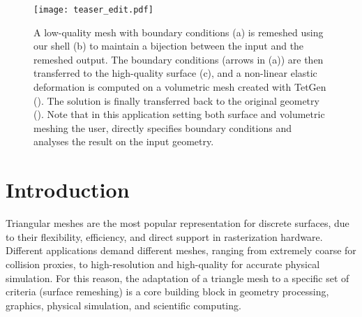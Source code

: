 
\begin{figure}
	\centering
	\texttt{[image: teaser\_edit.pdf]}
    \caption{A low-quality mesh with boundary conditions (a)
    is remeshed using our shell (b)
    to maintain a bijection between the input and the remeshed output.
    The boundary conditions (arrows in (a)) are then transferred to the high-quality surface (c),
    and a non-linear elastic deformation is computed %
    on a volumetric mesh created with TetGen ().
    The solution is finally transferred back to the original geometry ().
    Note that in this application setting both surface and volumetric meshing  the user,  directly specifies boundary conditions and analyses the result on the input geometry.}
    
    \label{fig:teaser}
\end{figure}

\section{Introduction}
\label{sec:introduction}

Triangular meshes are the most popular representation for discrete surfaces, due to their flexibility, efficiency, and direct support in rasterization hardware. Different applications demand different meshes, ranging from extremely coarse for collision proxies, to high-resolution and high-quality for accurate physical simulation.
%
For this reason, the adaptation of a triangle mesh to a specific set of criteria (surface remeshing) is a core building block in geometry processing, graphics, physical simulation, and scientific computing.

